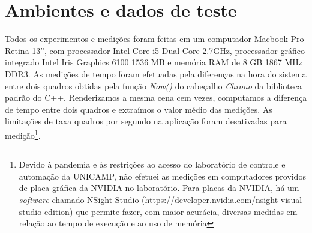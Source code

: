 \section{Ambientes e dados de teste}
\label{sec::ambientes_e_dados_de_dados}


Todos os experimentos e medições foram feitas em um computador Macbook Pro Retina 13'', com processador Intel Core i5 Dual-Core 2.7GHz, processador gráfico integrado Intel Iris Graphics 6100 1536 MB e memória RAM de 8 GB 1867 MHz DDR3.
As medições de tempo foram efetuadas pela diferenças na hora do sistema entre dois quadros obtidas pela função \textit{Now()} do cabeçalho \textit{Chrono} da biblioteca padrão do C++. Renderizamos a mesma cena cem vezes, computamos a diferença de tempo entre dois quadros e extraímos o valor médio das medições. As limitações de taxa quadros por segundo \sout{na aplicação} foram desativadas para medição\footnote{Devido à pandemia e às restrições ao acesso do laboratório de controle e automação da UNICAMP, não efetuei as medições em computadores providos de placa gráfica da NVIDIA no laboratório. Para placas da NVIDIA, há um \textit{software} chamado NSight Studio (\url{https://developer.nvidia.com/nsight-visual-studio-edition}) que permite fazer, com maior acurácia, diversas medidas em relação ao tempo de execução e ao uso de memória}.



